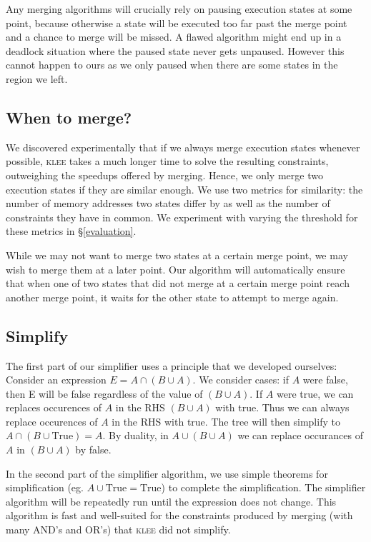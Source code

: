\documentclass[12pt,a4paper]{article}
\newcommand{\klee}{\textsc{klee }}
\begin{document}
Any merging algorithms will crucially rely on pausing execution states at some point, because otherwise a state will be executed too far past the merge point and a chance to merge will be missed. A flawed algorithm might end up in a deadlock situation where the paused state never gets unpaused. However this cannot happen to ours as we only paused when there are some states in the region we left.

\subsection{When to merge?}
We discovered experimentally that if we always merge execution states whenever possible, \klee takes a much longer time to solve the resulting constraints, outweighing the speedups offered by merging. Hence, we only merge two execution states if they are similar enough. We use two metrics for similarity: the number of memory addresses two states differ by as well as the number of constraints they have in common. We experiment with varying the threshold for these metrics in \S\ref{evaluation}.

While we may not want to merge two states at a certain merge point, we may wish to merge them at a later point. Our algorithm will automatically ensure that when one of two states that did not merge at a certain merge point reach another merge point, it waits for the other state to attempt to merge again.

\subsection{Simplify}
The first part of our simplifier uses a principle that we developed ourselves:
Consider an expression $E = A\cap(B\cup A)$. We consider cases: if $A$ were false, then E will be false regardless of the value of $(B\cup A)$. If $A$ were true, we can replaces occurences of $A$ in the RHS $(B\cup A)$ with true. Thus we can always replace occurences of $A$ in the RHS with true. The tree will then simplify to $A\cap(B\cup \text{True}) = A$. By duality, in $A\cup(B\cup A)$ we can replace occurances of $A$ in $(B\cup A)$ by false.

In the second part of the simplifier algorithm, we use simple theorems for simplification (eg. $A\cup \text{True} = \text{True}$) to complete the simplification. The simplifier algorithm will be repeatedly run until the expression does not change. This algorithm is fast and well-suited for the constraints produced by merging (with many AND's and OR's) that \klee did not simplify.
\end{document}
